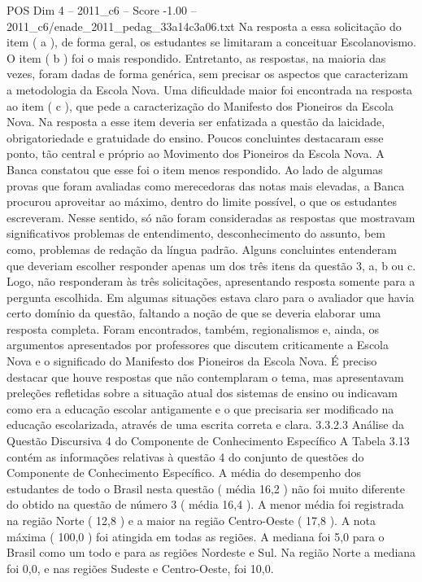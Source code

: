 \begin{textsample}{POS Dim 4 – 2011\_c6 – Score -1.00 – 2011\_c6/enade\_2011\_pedag\_33a14c3a06.txt}
Na resposta a essa solicitação do item ( a ), de forma geral, os estudantes se limitaram a conceituar Escolanovismo.
O item ( b ) foi o mais respondido.
Entretanto, as respostas, na maioria das vezes, foram dadas de forma genérica, sem precisar os aspectos que caracterizam a metodologia da Escola Nova.
Uma dificuldade maior foi encontrada na resposta ao item ( c ), que pede a caracterização do Manifesto dos Pioneiros da Escola Nova.
Na resposta a esse item deveria ser enfatizada a questão da laicidade, obrigatoriedade e gratuidade do ensino.
Poucos concluintes destacaram esse ponto, tão central e próprio ao Movimento dos Pioneiros da Escola Nova.
A Banca constatou que esse foi o item menos respondido.
Ao lado de algumas provas que foram avaliadas como merecedoras das notas mais elevadas, a Banca procurou aproveitar ao máximo, dentro do limite possível, o que os estudantes escreveram.
Nesse sentido, só não foram consideradas as respostas que mostravam significativos problemas de entendimento, desconhecimento do assunto, bem como, problemas de redação da língua padrão.
Alguns concluintes entenderam que deveriam escolher responder apenas um dos três itens da questão 3, a, b ou c.
Logo, não responderam às três solicitações, apresentando resposta somente para a pergunta escolhida.
Em algumas situações estava claro para o avaliador que havia certo domínio da questão, faltando a noção de que se deveria elaborar uma resposta completa.
Foram encontrados, também, regionalismos e, ainda, os argumentos apresentados por professores que discutem criticamente a Escola Nova e o significado do Manifesto dos Pioneiros da Escola Nova.
É preciso destacar que houve respostas que não contemplaram o tema, mas apresentavam preleções refletidas sobre a situação atual dos sistemas de ensino ou indicavam como era a educação escolar antigamente e o que precisaria ser modificado na educação escolarizada, através de uma escrita correta e clara. 3.3.2.3 Análise da Questão Discursiva 4 do Componente de Conhecimento Específico A Tabela 3.13 contém as informações relativas à questão 4 do conjunto de questões do Componente de Conhecimento Específico.
A média do desempenho dos estudantes de todo o Brasil nesta questão ( média 16,2 ) não foi muito diferente do obtido na questão de número 3 ( média 16,4 ).
A menor média foi registrada na região Norte ( 12,8 ) e a maior na região Centro-Oeste ( 17,8 ).
A nota máxima ( 100,0 ) foi atingida em todas as regiões.
A mediana foi 5,0 para o Brasil como um todo e para as regiões Nordeste e Sul.
Na região Norte a mediana foi 0,0, e nas regiões Sudeste e Centro-Oeste, foi 10,0.

\end{textsample}
